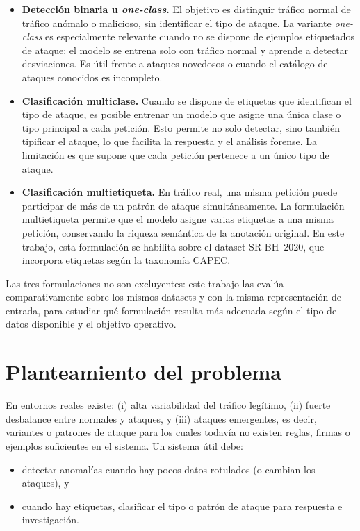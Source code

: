 \documentclass[12pt,oneside]{report}
\begin{document}
\begin{itemize}[leftmargin=*]
  \item \textbf{Detección binaria u \textit{one-class}.} El objetivo es distinguir tráfico normal de tráfico anómalo o malicioso, sin identificar el tipo de ataque. La variante \textit{one-class} es especialmente relevante cuando no se dispone de ejemplos etiquetados de ataque: el modelo se entrena solo con tráfico normal y aprende a detectar desviaciones. Es útil frente a ataques novedosos o cuando el catálogo de ataques conocidos es incompleto.

  \item \textbf{Clasificación multiclase.} Cuando se dispone de etiquetas que identifican el tipo de ataque, es posible entrenar un modelo que asigne una única clase o tipo principal a cada petición. Esto permite no solo detectar, sino también tipificar el ataque, lo que facilita la respuesta y el análisis forense. La limitación es que supone que cada petición pertenece a un único tipo de ataque.

  \item \textbf{Clasificación multietiqueta.} En tráfico real, una misma petición puede participar de más de un patrón de ataque simultáneamente. La formulación multietiqueta permite que el modelo asigne varias etiquetas a una misma petición, conservando la riqueza semántica de la anotación original. En este trabajo, esta formulación se habilita sobre el dataset SR-BH~2020, que incorpora etiquetas según la taxonomía CAPEC.
\end{itemize}

Las tres formulaciones no son excluyentes: este trabajo las evalúa comparativamente sobre los mismos datasets y con la misma representación de entrada, para estudiar qué formulación resulta más adecuada según el tipo de datos disponible y el objetivo operativo.

\section{Planteamiento del problema}
En entornos reales existe: (i) alta variabilidad del tráfico legítimo, (ii) fuerte desbalance entre normales y ataques,
y (iii) ataques emergentes, es decir, variantes o patrones de ataque para los cuales todavía no existen reglas, firmas o ejemplos suficientes en el sistema. Un sistema útil debe:
\begin{itemize}[leftmargin=*]
  \item detectar anomalías cuando hay pocos datos rotulados (o cambian los ataques), y
  \item cuando hay etiquetas, clasificar el tipo o patrón de ataque para respuesta e investigación.
\end{itemize}
\end{document}
